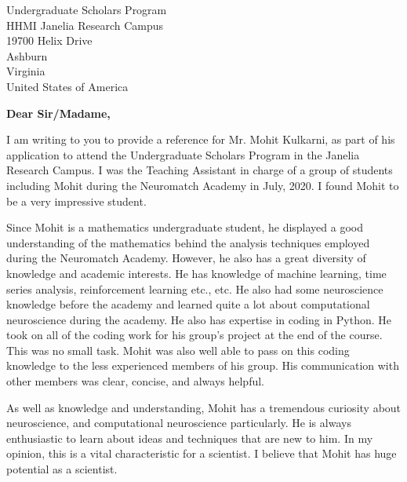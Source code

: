 \documentclass[11pt]{letter} %
\begin{document}

\begin{letter}{Undergraduate Scholars Program \\
  HHMI Janelia Research Campus \\
  19700 Helix Drive\\
  Ashburn \\
  Virginia \\
  United States of America} %


  \opening{\textbf{Dear Sir/Madame,}}

  I am writing to you to provide a reference for Mr. Mohit Kulkarni, as part of his application to attend the Undergraduate Scholars Program in the Janelia Research Campus. I was the Teaching Assistant in charge of a group of students including Mohit during the Neuromatch Academy in July, 2020. I found Mohit to be a very impressive student.

  Since Mohit is a mathematics undergraduate student, he displayed a good understanding of the mathematics behind the analysis techniques employed during the Neuromatch Academy. However, he also has a great diversity of knowledge and academic interests. He has knowledge of machine learning, time series analysis, reinforcement learning etc., etc. He also had some neuroscience knowledge before the academy and learned quite a lot about computational neuroscience during the academy. He also has expertise in coding in Python. He took on all of the coding work for his group's project at the end of the course. This was no small task. Mohit was also well able to pass on this coding knowledge to the less experienced members of his group. His communication with other members was clear, concise, and always helpful.

  As well as knowledge and understanding, Mohit has a tremendous curiosity about neuroscience, and computational neuroscience particularly. He is always enthusiastic to learn about ideas and techniques that are new to him. In my opinion, this is a vital characteristic for a scientist. I believe that Mohit has huge potential as a scientist.


\end{letter}
\end{document}
